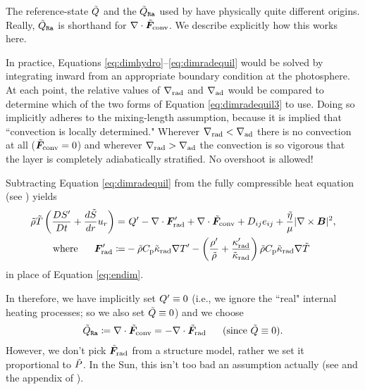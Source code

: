 \documentclass[12pt]{article}
\numberwithin{equation}{section}
\begin{document}
The reference-state $\tilde{Q}$ and the $\tilde{Q}_{\texttt{Ra}}$ used by {\rayleigh} have physically quite different origins. Really, $\tilde{Q}_{\texttt{Ra}}$ is shorthand for $\nabla\cdot\tilde{\bm{F}}_{\rm conv}$. We describe explicitly how this works here. 

In practice, Equations \eqref{eq:dimhydro}--\eqref{eq:dimradequil} would be solved by integrating inward from an appropriate boundary condition at the photosphere. At each point, the relative values of $\nabla_{\rm rad}$ and $\nabla_{\rm ad}$ would be compared to determine which of the two forms of Equation \eqref{eq:dimradequil3} to use. Doing so implicitly adheres to the mixing-length assumption, because it is implied that ``convection is locally determined." Wherever $\nabla_{\rm rad} <\nabla_{\rm ad}$ there is no convection at all ($\tilde{\bm{F}}_{\rm conv}=0$) and wherever $\nabla_{\rm rad} >\nabla_{\rm ad}$ the convection is so vigorous that the layer is completely adiabatically stratified. No overshoot is allowed! 



Subtracting Equation \eqref{eq:dimradequil} from the fully compressible heat equation (see \citealt{Matilsky2024b}) yields
\begin{subequations}\label{eq:endim2}
\begin{align}
	\tilde{\rho}\tilde{T} \left(\frac{D{S^\prime}}{Dt} + \frac{d\tilde{S}}{dr} u_r\right) = &\ {Q^\prime} -\nabla\cdot\bm{F}^\prime_{\rm rad}  +\nabla\cdot\tilde{\bm{F}}_{\rm conv}+ D_{ij}e_{ij} + \frac{\tilde{\eta}}{\mu}|\nabla\times\bm{B}|^2,\\
	\text{where}\ \ \ \ \  \bm{F}^\prime_{\rm rad} \coloneqq & -\tilde{\rho} C_{\rm{p}} \tilde{\kappa}_{\rm rad} \nabla{T^\prime} -\left(\frac{{\rho^\prime}}{\tilde{\rho}} + \frac{\kappa^\prime_{\rm rad}}{\tilde{\kappa}_{\rm rad}}\right)\tilde{\rho}C_{\rm{p}}\tilde{\kappa}_{\rm rad}\nabla\tilde{T}
\end{align}
\end{subequations}
in place of Equation \eqref{eq:endim}. 

In {\rayleigh} therefore, we have implicitly set ${Q^\prime}\equiv0$ (i.e., we ignore the ``real" internal heating processes; so we also set $\tilde{Q}\equiv0$) and we choose 
\begin{align}
	\heatra\define \Div\fconvtilde=-\Div\fradtilde\five\text{(since}\ \heattilde\equiv0\text{)}.
\end{align}
However, we don't pick $\tilde{\bm{F}}_{\rm rad}$ from a structure model, rather we set it proportional to $\tilde{P}$. In the Sun, this isn't too bad an assumption actually (see \citealt{Featherstone2016a} and the appendix of \citealt{Matilsky2024}).
\end{document}
